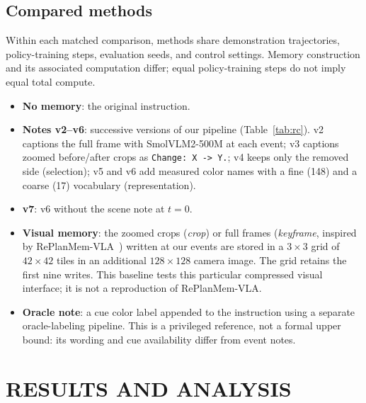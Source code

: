 \documentclass{IJCAS}
\newcommand{\note}[1]{\texttt{\small #1}}
\begin{document}
\subsection{Compared methods}
Within each matched comparison, methods share demonstration trajectories, policy-training steps, evaluation seeds, and control settings. Memory construction and its associated computation differ; equal policy-training steps do not imply equal total compute.
\begin{itemize}
\item \textbf{No memory}: the original instruction.
\item \textbf{Notes v2--v6}: successive versions of our pipeline (Table~\ref{tab:rc}). v2 captions the full frame with SmolVLM2-500M at each event; v3 captions zoomed before/after crops as \note{Change: X -> Y.}; v4 keeps only the removed side (selection); v5 and v6 add measured color names with a fine (148) and a coarse (17) vocabulary (representation).
\item \textbf{v7}: v6 without the scene note at $t=0$.
\item \textbf{Visual memory}: the zoomed crops (\emph{crop}) or full frames (\emph{keyframe}, inspired by RePlanMem-VLA~\cite{replanmem}) written at our events are stored in a $3\times3$ grid of $42\times42$ tiles in an additional $128\times128$ camera image. The grid retains the first nine writes. This baseline tests this particular compressed visual interface; it is not a reproduction of RePlanMem-VLA.
\item \textbf{Oracle note}: a cue color label appended to the instruction using a separate oracle-labeling pipeline. This is a privileged reference, not a formal upper bound: its wording and cue availability differ from event notes.
\end{itemize}

\section{RESULTS AND ANALYSIS}
\end{document}
